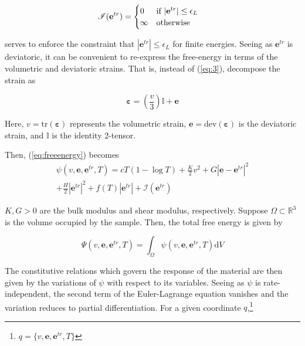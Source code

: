 \begin{multicols}{2}
\begin{align}
    \mathscr{I}(\vb{e}^{tr}) &=
    \begin{cases}
        0 & \text{if $|\mathbf{e}^{tr}| \leq \epsilon_L$} \\
        \infty & \text{otherwise}
    \end{cases}\label{eq:indicator}
\end{align}

serves to enforce the constraint that $|\mathbf{e}^{tr}| \leq \epsilon_L$ for finite energies. Seeing as $\mathbf{e}^{tr}$ is deviatoric, it can be convenient to re-express the free-energy in terms of the volumetric and deviatoric strains. That is, instead of (\ref{eq:3}), decompose the strain as

\begin{equation} \label{eq:5}
    \bm{\varepsilon} = \left(\frac{v}{3}\right)\mathbb{I} + \mathbf{e}
\end{equation}

Here, $v = \mathrm{tr}(\bm{\varepsilon})$ represents the volumetric strain, $\mathbf{e} = \mathrm{dev}(\bm{\varepsilon})$ is the deviatoric strain, and $\mathbb{I}$ is the identity 2-tensor. 

Then, (\ref{eq:freeenergy}) becomes
\begin{multline} \label{eq:6}
    \psi(v, \mathbf{e}, \mathbf{e}^{tr},  T) = c T(1 - \log T) + \frac{K}{2}v^{2} + G|\mathbf{e} - \mathbf{e}^{tr}|^{2}\\
    + \frac{H}{2}|\mathbf{e}^{tr}|^{2} + f( T)|\mathbf{e}^{tr}| + \mathscr{I}(\mathbf{e}^{tr})
\end{multline}

$K, G > 0$ are the bulk modulus and shear modulus, respectively. Suppose $\Omega \subset \mathbb{R}^3$ is the volume occupied by the sample. Then, the total free energy is given by

\begin{equation}
    \Psi(v, \mathbf{e}, \mathbf{e}^{tr},  T) = \int_{\Omega} \psi(v, \mathbf{e}, \mathbf{e}^{tr},  T) \mathrm{d}V
\end{equation}

The constitutive relations which govern the response of the material are then given by the variations of $\psi$ with respect to its variables. Seeing as $\psi$ is rate-independent, the second term of the Euler-Lagrange equation vanishes and the variation reduces to partial differentiation. For a given coordinate $q$,\footnote{$q = \{v, \mathbf{e}, \mathbf{e}^{tr},  T\}$}


\end{multicols}
